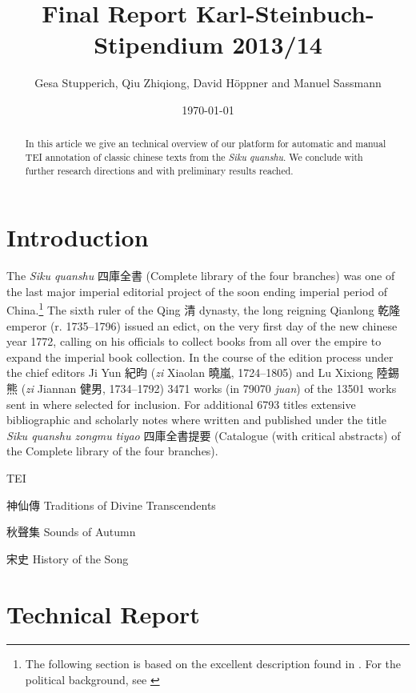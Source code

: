 \documentclass[12pt, draft]{article}
\begin{document}
\title{Final Report Karl-Steinbuch-Stipendium 2013/14}
\author{Gesa Stupperich, Qiu Zhiqiong, David Höppner and Manuel Sassmann}
\date{\today}
\maketitle

\begin{abstract}
In this article we
give an technical overview of
our platform for automatic and manual
TEI annotation of classic chinese texts from the \emph{Siku quanshu}.
We conclude with further research directions and
with preliminary results reached.
\end{abstract}

\section{Introduction}

The \emph{Siku quanshu} 四庫全書 (Complete library of the four branches)
was one of the last major imperial editorial project of the
soon ending imperial period of China.\footnote{The following section is based on the excellent
description found in \cite[945-954]{Wilkinson:2012}. For the political
background, see \cite{Guy:1987}}
The sixth ruler of the Qing 清 dynasty, the long reigning
Qianlong 乾隆 emperor (r. 1735--1796) issued an edict,
on the very first
day of the new chinese year 1772, calling on his officials to collect books from
all over the empire to expand the imperial book collection.
In the course of the edition process under the
chief editors Ji Yun 紀昀 (\emph{zi} Xiaolan 曉嵐, 1724--1805) and Lu Xixiong 陸錫熊
(\emph{zi} Jiannan 健男, 1734--1792) 3471 works (in 79070 \emph{juan})
of the 13501 works sent in where selected for inclusion.
For additional 6793 titles extensive bibliographic and scholarly
notes where written and published under the title \emph{Siku quanshu zongmu tiyao}
四庫全書提要 (Catalogue (with critical abstracts) of the Complete library of the 
four branches).

TEI

神仙傳 Traditions of Divine Transcendents

秋聲集 Sounds of Autumn

宋史 History of the Song

 
\section{Technical Report}
\end{document}
